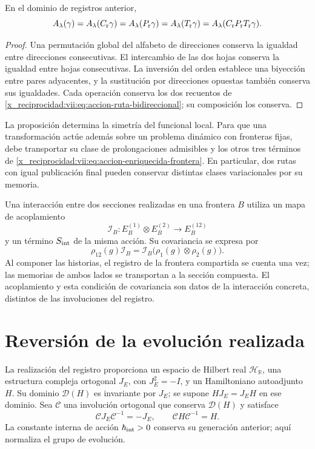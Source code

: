 \begin{proposition}
\label{x_reciprocidad:vii:prop:invariancia-ruta-bidireccional}
En el dominio de registros anterior,
\[
 \mathcal A_\lambda(\gamma)
 =\mathcal A_\lambda(\mathcal C_{\rm r}\gamma)
 =\mathcal A_\lambda(\mathcal P_{\rm r}\gamma)
 =\mathcal A_\lambda(\mathcal T_{\rm r}\gamma)
 =\mathcal A_\lambda(\mathcal C_{\rm r}\mathcal P_{\rm r}
                              \mathcal T_{\rm r}\gamma).
\]
\end{proposition}
\begin{proof}
Una permutación global del alfabeto de direcciones conserva la igualdad
entre direcciones consecutivas. El intercambio de las dos hojas conserva
la igualdad entre hojas consecutivas. La inversión del orden establece una
biyección entre pares adyacentes, y la sustitución por direcciones opuestas
también conserva sus igualdades. Cada operación conserva los dos recuentos
de \eqref{x_reciprocidad:vii:eq:accion-ruta-bidireccional}; su composición los conserva.
\end{proof}

La proposición determina la simetría del funcional local. Para que una
transformación actúe además sobre un problema dinámico con fronteras fijas,
debe transportar su clase de prolongaciones admisibles y los otros tres
términos de \eqref{x_reciprocidad:vii:eq:accion-enriquecida-frontera}. En particular, dos
rutas con igual publicación final pueden conservar distintas clases
variacionales por su memoria.

Una interacción entre dos secciones realizadas en una frontera \(B\)
utiliza un mapa de acoplamiento
\[
 \mathcal I_B:E_B^{(1)}\otimes E_B^{(2)}\longrightarrow E_B^{(12)}
\]
y un término \(\mathcal S_{\rm int}\) de la misma acción. Su covariancia
se expresa por
\[
 \rho_{12}(g)\mathcal I_B
 =\mathcal I_B\bigl(\rho_1(g)\otimes\rho_2(g)\bigr).
\]
Al componer las historias, el registro de la frontera compartida se cuenta
una vez; las memorias de ambos lados se transportan a la sección compuesta.
El acoplamiento y esta condición de covariancia son datos de la interacción
concreta, distintos de las involuciones del registro.

\section{Reversión de la evolución realizada}
\label{x_reciprocidad:vii:subsec:reversion-evolucion}

La realización del registro proporciona un espacio de Hilbert real
\(\mathcal H_{\mathbb R}\), una estructura compleja ortogonal
\(J_E\), con \(J_E^2=-I\), y un Hamiltoniano autoadjunto \(H\).
Su dominio \(\mathcal D(H)\) es invariante por \(J_E\); se supone
\(HJ_E=J_EH\) en ese dominio. Sea \(\mathcal C\) una involución
ortogonal que conserva \(\mathcal D(H)\) y satisface
\begin{equation}
 \mathcal C J_E\mathcal C^{-1}=-J_E,\qquad
 \mathcal C H\mathcal C^{-1}=H.
 \label{x_reciprocidad:vii:eq:dominio-reversion-evolucion}
\end{equation}
La constante interna de acción \(\hbar_{\rm int}>0\) conserva su
generación anterior; aquí normaliza el grupo de evolución.


